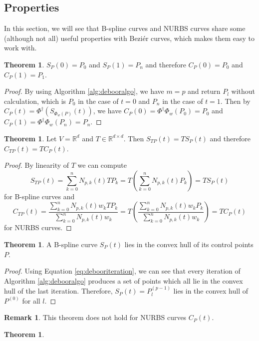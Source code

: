 \documentclass[a4paper, 11pt]{report}
\theoremstyle{definition}
\newtheorem{theorem}[definition]{Theorem}
\newtheorem*{remark}{Remark}
\begin{document}
\subsection{Properties}
In this section, we will see that B-spline curves and NURBS curves share some (although not all) useful properties with Beziér curves, which makes them easy to work with.

\begin{theorem}
	$S_P(0) = P_0$ and $S_P(1) = P_n$ and therefore $C_P(0) = P_0$ and $C_P(1) = P_1$.
\end{theorem}
\begin{proof}
	By using Algorithm \ref{alg:debooralgo}, we have $m = p$ and return $P_l$ without calculation, which is $P_0$ in the case of $t = 0$ and $P_n$ in the case of $t = 1$. Then by $C_P(t) = \Phi^\dagger(S_{\Phi_w(P)}(t))$, we have $C_P(0) = \Phi^\dagger\Phi_w(P_0) = P_0$ and $C_P(1) = \Phi^\dagger\Phi_w(P_n) = P_n$.
\end{proof}

\begin{theorem}
	Let $V = \mathbb{R}^d$ and $T \in \mathbb{R}^{d \times d}$. Then $S_{TP}(t) = TS_P(t)$ and therefore $C_{TP}(t) = TC_P(t)$.
\end{theorem}
\begin{proof}
	By linearity of $T$ we can compute
		$$S_{TP}(t) = \sum_{k=0}^{n} N_{p,k}(t) TP_k = T \left( \sum_{k=0}^{n} N_{p,k}(t) P_k \right) = TS_P(t)$$
	for B-spline curves and
		$$C_{TP}(t) = \frac{\sum_{k=0}^n N_{p,k}(t) w_k TP_k}{\sum_{k=0}^n N_{p,k}(t) w_k} = T \left( \frac{\sum_{k=0}^n N_{p,k}(t) w_k P_k}{\sum_{k=0}^n N_{p,k}(t) w_k} \right) = TC_P(t)$$
	for NURBS curves.
\end{proof}

\begin{theorem}
	A B-spline curve $S_P(t)$ lies in the convex hull of its control points $P$.
\end{theorem}
\begin{proof}
	Using Equation \ref{eq:debooriteration}, we can see that every iteration of Algorithm \ref{alg:debooralgo} produces a set of points which all lie in the convex hull of the last iteration. Therefore, $S_P(t) = P^{(p-1)}_l$ lies in the convex hull of $P^{(0)}$ for all $l$.
\end{proof}
\begin{remark}
	This theorem does not hold for NURBS curves $C_P(t)$.
\end{remark}

\begin{theorem}
	
\end{theorem}
\end{document}
